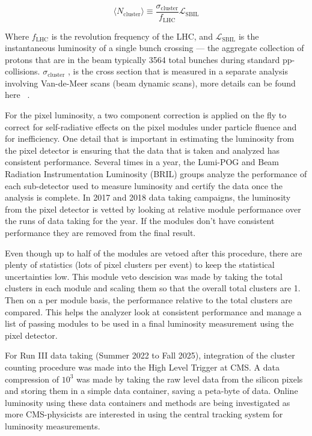 \begin{equation}
\label{eq:pcclum}
\langle N_{\text{cluster}}\rangle\equiv\frac{\sigma_{\text{cluster}}}{f_{\text{LHC}}}\mathcal{L}_{\text{SBIL}}
\end{equation}

Where $f_{\text{LHC}}$ is the revolution frequency of the LHC, and $\mathcal{L}_{\text{SBIL}}$ is the instantaneous luminosity of a single bunch crossing --- the aggregate collection of protons that are in the beam typically 3564 total bunches during standard pp-collisions. $\sigma_{\text{cluster}}$ , is the cross section that is measured in a separate analysis involving Van-de-Meer scans (beam dynamic scans), more details can be found here ~\cite{Knolle:2792593}. 



For the pixel luminosity, a two component correction is applied on the fly to correct for self-radiative effects on the pixel modules under particle fluence and for inefficiency.  
One detail that is important in estimating the luminosity from the pixel detector is ensuring that the data that is taken and analyzed has consistent performance. Several times in a year, the Lumi-POG and Beam Radiation Instrumentation Luminosity (BRIL) groups analyze the performance of each sub-detector used to measure luminosity and certify the data once the analysis is complete. In 2017 and 2018 data taking campaigns, the luminosity from the pixel detector is vetted by looking at relative module performance over the runs of data taking for the year. If the modules don't have consistent performance they are removed from the final result. 

Even though up to half of the modules are vetoed after this procedure, there are plenty of statistics (lots of pixel clusters per event) to keep the statistical uncertainties low. 
This module veto descision was made by taking the total clusters in each module and scaling them so that the overall total clusters are 1. Then on a per module basis, the performance relative to the total clusters are compared. This helps the analyzer look at consistent performance and manage a list of passing modules to be used in a final luminosity measurement using the pixel detector. 

For Run III data taking (Summer 2022 to Fall 2025), integration of the cluster counting procedure was made into the High Level Trigger at CMS. A data compression of $10^3$ was made by taking the raw level data from the silicon pixels and storing them in a simple data container, saving a peta-byte of data. Online luminosity using these data containers and methods are being investigated as more CMS-physicists are interested in using the central tracking system for luminosity measurements.

